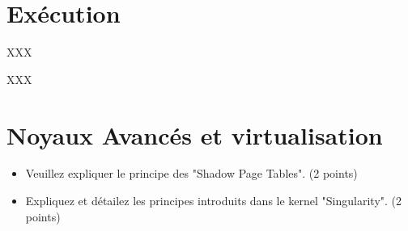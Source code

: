 %
%

\section{Ex\'ecution
         {\hfill{} }}

XXX

\begin{correction}

XXX

\end{correction}

%
%

\section{Noyaux Avanc\'es et virtualisation
         }


\begin{itemize}
    \item
        Veuillez expliquer le principe des "Shadow Page Tables". (2 points)
    \item
        Expliquez et d\'etailez les principes introduits dans le kernel "Singularity". (2 points)
\end{itemize}



